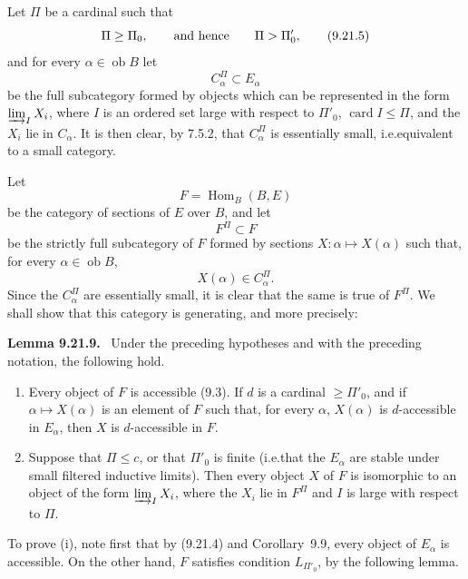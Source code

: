 \documentclass[11pt]{article}
\newcommand{\ob}{\operatorname{ob}}
\newcommand{\card}{\operatorname{card}}
\newcommand{\Hhom}{\operatorname{Hom}}
\newcommand{\ie}{i.e.}
\newenvironment{statement}[1]{\par\medskip\noindent\textbf{#1.}\ }{\par\medskip}
\begin{document}
Let $\Pi$ be a cardinal such that
\begin{equation}
 \Pi\geq\Pi_0,\qquad\hbox{and hence}\qquad \Pi>\Pi'_0,
 \tag{9.21.5}
\end{equation}
and for every $\alpha\in\ob B$ let
\begin{equation}
 C^\Pi_\alpha\subset E_\alpha
 \tag{9.21.6}
\end{equation}
be the full subcategory formed by objects which can be represented in the form $\varinjlim_I X_i$, where $I$ is an ordered set large with respect to $\Pi'_0$, $\card I\leq\Pi$, and the $X_i$ lie in $C_\alpha$. It is then clear, by 7.5.2, that $C^\Pi_\alpha$ is essentially small, \ie equivalent to a small category.

Let
\begin{equation}
 F=\Hhom_B(B,E)
 \tag{9.21.7}
\end{equation}
be the category of sections of $E$ over $B$, and let
\begin{equation}
 F^\Pi\subset F
 \tag{9.21.8}
\end{equation}
be the strictly full subcategory of $F$ formed by sections $X:\alpha\mapsto X(\alpha)$ such that, for every $\alpha\in\ob B$,
\[
 X(\alpha)\in C^\Pi_\alpha.
\]
Since the $C^\Pi_\alpha$ are essentially small, it is clear that the same is true of $F^\Pi$. We shall show that this category is generating, and more precisely:

\begin{statement}{Lemma 9.21.9}
Under the preceding hypotheses and with the preceding notation, the following hold.
\begin{enumerate}[label=(\roman*)]
\item Every object of $F$ is accessible (9.3). If $d$ is a cardinal $\geq\Pi'_0$, and if $\alpha\mapsto X(\alpha)$ is an element of $F$ such that, for every $\alpha$, $X(\alpha)$ is $d$-accessible in $E_\alpha$, then $X$ is $d$-accessible in $F$.

\item Suppose that $\Pi\leq c$, or that $\Pi'_0$ is finite (\ie that the $E_\alpha$ are stable under small filtered inductive limits). Then every object $X$ of $F$ is isomorphic to an object of the form $\varinjlim_I X_i$, where the $X_i$ lie in $F^\Pi$ and $I$ is large with respect to $\Pi$.
\end{enumerate}
\end{statement}

To prove (i), note first that by (9.21.4) and Corollary~9.9, every object of $E_\alpha$ is accessible. On the other hand, $F$ satisfies condition $L_{\Pi'_0}$, by the following lemma.
\end{document}
